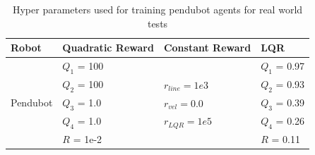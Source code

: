 \begin{table}[H]
  \centering
  \begin{tabular}{p{2cm} | p{3cm} | p{3cm} | p{3cm}}
  Robot & Quadratic Reward  & Constant Reward & LQR\\
  \hline
  \multirow{5}{*}{Pendubot} & \(Q_1\) = 100 &  & \(Q_1\) = 0.97\\
  & \(Q_2\) = 100  & \(r_{line}=1e3\) & \(Q_2\) = 0.93\\
  & \(Q_3\) = 1.0  & \(r_{vel}=0.0\) & \(Q_3\) = 0.39\\
  & \(Q_4\) = 1.0  & \(r_{LQR}=1e5\)& \(Q_4\) = 0.26\\
  & \(R\) = 1e-2  & & \(R\) = 0.11\\
  \end{tabular}
 \caption{Hyper parameters used for training pendubot agents for real world tests}
 \label{tab:training_parameters_real_world_pendubot}
\end{table}

